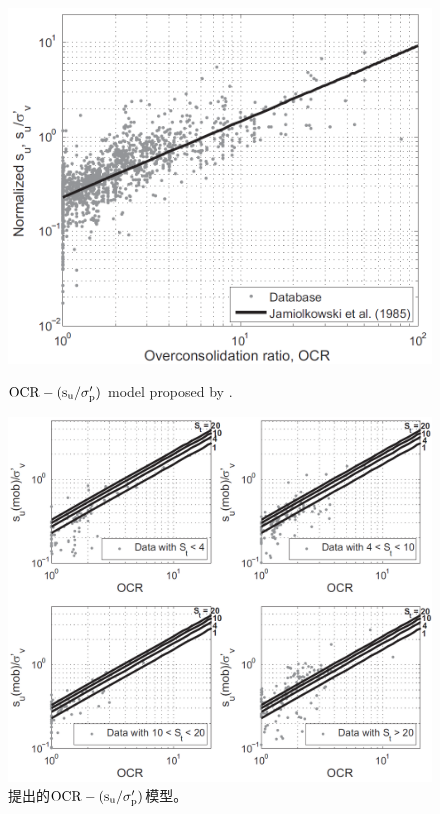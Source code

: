 \begin{figure}[!p]
    \centering
    \begin{minipage}[t]{0.48\textwidth}
        \centering
        \includegraphics[width=\textwidth]{figures/figure-10.png}
        \caption{$\rm{OCR}-(s_u/\sigma_p')$ model proposed by \citet{Jamiolkowski198557}.}
        \vspace{-5pt}
        \addtocounter{figure}{-1}
        \renewcommand{\figurename}{图}
        \caption{\citet{Jamiolkowski198557}提出的$\rm{OCR}-(s_u/\sigma_p')$模型。}
        \renewcommand{\figurename}{Figure}
    \end{minipage}
    \begin{minipage}[t]{0.48\textwidth}
        \centering
        \includegraphics[width=\textwidth]{figures/figure-11.png}

\end{minipage}
\end{figure}
